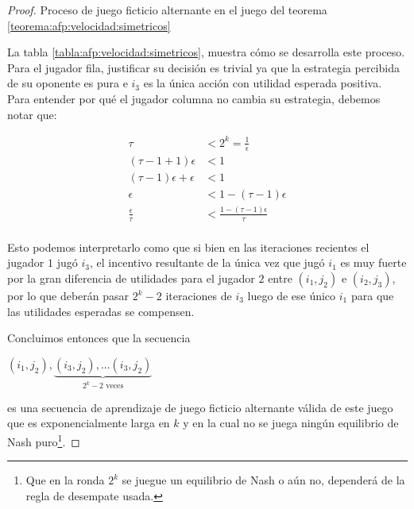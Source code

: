 \begin{proof}
    \begin{table}
        
        \caption{Proceso de juego ficticio alternante en el juego del teorema \ref{teorema:afp:velocidad:simetricos}}
        \label{tabla:afp:velocidad:simetricos}
    \end{table}

    La tabla \ref{tabla:afp:velocidad:simetricos}, muestra cómo se desarrolla este proceso. Para el jugador fila, justificar su decisión es trivial ya que la estrategia percibida de su oponente es pura e $i_3$ es la única acción con utilidad esperada positiva. Para entender por qué el jugador columna no cambia su estrategia, debemos notar que:

    \begin{align*}
        \tau &< 2^k = \frac{1}{\epsilon} \\
        (\tau - 1 + 1) \epsilon &< 1\\
        (\tau - 1) \epsilon + \epsilon &< 1\\
        \epsilon &< 1-(\tau-1)\epsilon\\
        \frac{\epsilon}{\tau} &< \frac{1-(\tau-1)\epsilon}{\tau}\\
    \end{align*}

    Esto podemos interpretarlo como que si bien en las iteraciones recientes el jugador $1$ jugó $i_3$, el incentivo resultante de la única vez que jugó $i_1$ es muy fuerte por la gran diferencia de utilidades para el jugador $2$ entre $(i_1, j_2)$ e $(i_2, j_3)$, por lo que deberán pasar $2^{k}-2$ iteraciones de $i_3$ luego de ese único $i_1$ para que las utilidades esperadas se compensen.

    Concluimos entonces que la secuencia

    \begin{center}
    \begin{math}
        (i_1, j_2), \underbrace{(i_3, j_2), ... (i_3, j_2)}_{\text{$2^k - 2$ veces}}
    \end{math}
    \end{center}

    es una secuencia de aprendizaje de juego ficticio alternante válida de este juego que es exponencialmente larga en $k$ y en la cual no se juega ningún equilibrio de Nash puro\footnote{Que en la ronda $2^k$ se juegue un equilibrio de Nash o aún no, dependerá de la regla de desempate usada.}.

\end{proof}

